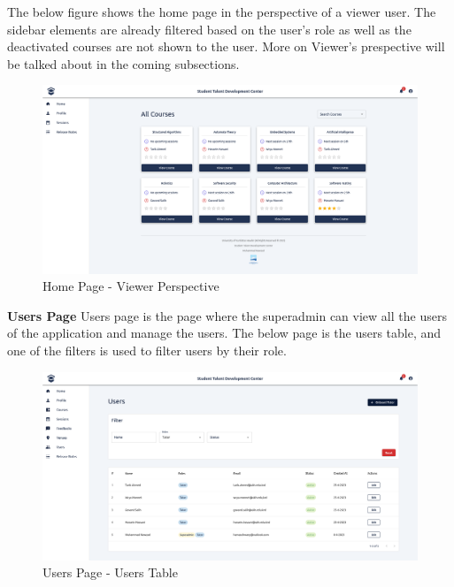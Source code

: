 \begin{justify}
    \vspace{0.25cm}
    \newendline The below figure shows the home page in the perspective of a viewer user. The sidebar elements are already filtered based on the user's role as well as the deactivated courses are not shown to the user. More on Viewer's prespective will be talked about in the coming subsections.

    \begin{figure}[H]
        \centerline{\includegraphics[width=150mm,scale=1]{figures/implementation_and_testing/implementation/frontend/pages/Homepage Viewer Prespective.png}}
        \caption{Home Page - Viewer Perspective}
    \end{figure}

    \noindent \textbf{Users Page}\newendline
    Users page is the page where the superadmin can view all the users of the application and manage the users. The below page is the users table, and one of the filters is used to filter users by their role.

    \begin{figure}[H]
        \centerline{\includegraphics[width=150mm,scale=1]{figures/implementation_and_testing/implementation/frontend/pages/Users - Filtered By Tutor Role.png}}
        \caption{Users Page - Users Table}
    \end{figure}


\end{justify}
